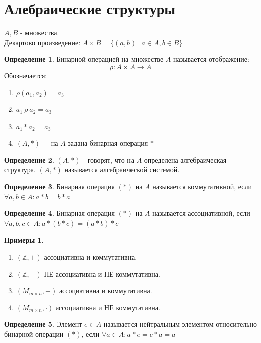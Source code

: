 \documentclass[a4paper, 12pt]{article}
\newcommand{\Z}{\mathbb Z}
\newcommand\tab[1][.5cm]{\hspace*{#1}}
\theoremstyle{definition}
\newtheorem*{definition}{Определение}
\newtheorem*{example}{Примеры}
\begin{document}
  \newpage
  
  \section{Алебраические структуры}
  $A,B$ - множества. \\
  Декартово произведение: $A \times B = \{(a,b)\ |\ a \in A, b \in B\}$ 
  \begin{definition}
    Бинарной операцией на множестве $A$ называется отображение: $$\rho:A \times A \to A$$ 
    Обозначается: \begin{enumerate}
      \item $\rho(a_1,a_2) = a_3$
      \item $a_1 \ \rho \ a_2 = a_3$
      \item $a_1 * a_2 = a_3$ 
      \item $(A, *) - $ на $A$ задана бинарная операция $*$ 
    \end{enumerate}
  \end{definition}    
  \begin{definition}
    $(A,*)$ - говорят, что на $A$ определена алгебраическая структура. $(A,*)$ называется алгебраической системой. 
  \end{definition} 
  \begin{definition}
    Бинарная операция $(*)$ на $A$ называется коммутативной, если $\forall a,b \in A: a*b=b*a$ 
  \end{definition} 
  \begin{definition}
    Бинарная операция $(*)$ на $A$ называется ассоциативной, если $\forall a,b,c \in A: a*(b*c)=(a*b)*c$ 
  \end{definition}
  \begin{example}
    \begin{enumerate} \tab
      \item $(\Z, +)$ ассоциативна и коммутативна. 
      \item $(\Z, -)$ НЕ ассоциативна и НЕ коммутативна.
      \item $(M_{m \times n}, +)$ ассоциативна и коммутативна.
      \item $(M_{m \times n}, \cdot)$ ассоциативна и НЕ коммутативна.
    \end{enumerate}
  \end{example}
  \begin{definition}
    Элемент $e \in A$ называется нейтральным элементом относительно бинарной операции $(*)$, если $\forall a \in A: a*e = e*a = a$ 
  \end{definition} 
\end{document}

